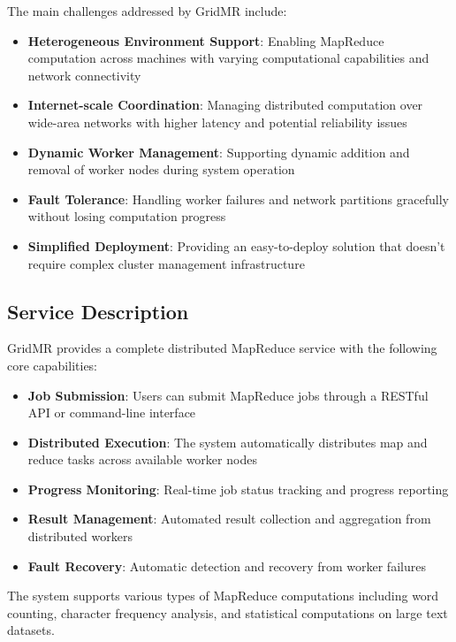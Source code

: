 \documentclass[11pt,letterpaper,oneside]{article}
\begin{document}
The main challenges addressed by GridMR include:

\begin{itemize}
    \item \textbf{Heterogeneous Environment Support}: Enabling MapReduce computation across machines with varying computational capabilities and network connectivity
    \item \textbf{Internet-scale Coordination}: Managing distributed computation over wide-area networks with higher latency and potential reliability issues
    \item \textbf{Dynamic Worker Management}: Supporting dynamic addition and removal of worker nodes during system operation
    \item \textbf{Fault Tolerance}: Handling worker failures and network partitions gracefully without losing computation progress
    \item \textbf{Simplified Deployment}: Providing an easy-to-deploy solution that doesn't require complex cluster management infrastructure
\end{itemize}

\subsection{Service Description}

GridMR provides a complete distributed MapReduce service with the following core capabilities:

\begin{itemize}
    \item \textbf{Job Submission}: Users can submit MapReduce jobs through a RESTful API or command-line interface
    \item \textbf{Distributed Execution}: The system automatically distributes map and reduce tasks across available worker nodes
    \item \textbf{Progress Monitoring}: Real-time job status tracking and progress reporting
    \item \textbf{Result Management}: Automated result collection and aggregation from distributed workers
    \item \textbf{Fault Recovery}: Automatic detection and recovery from worker failures
\end{itemize}

The system supports various types of MapReduce computations including word counting, character frequency analysis, and statistical computations on large text datasets.
\end{document}
